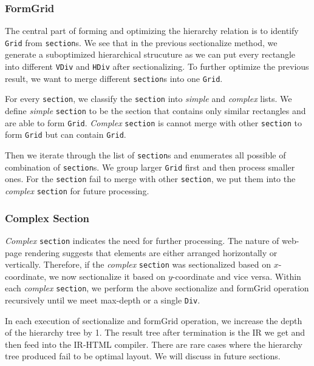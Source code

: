 \documentclass[runningheads]{llncs}
\begin{document}
\subsubsection{FormGrid} The central part of forming and optimizing the hierarchy relation is to identify \lstinline{Grid} from \lstinline{section}s. We see that in the previous sectionalize method, we generate a suboptimized hierarchical strucuture as we can put every rectangle into different \lstinline{VDiv} and \lstinline{HDiv} after sectionalizing. To further optimize the previous result, we want to merge different \lstinline{section}s into one \lstinline{Grid}.

For every \lstinline{section}, we classify the \lstinline{section} into \textit{simple} and \textit{complex} lists. We define \textit{simple} \lstinline{section} to be the section that contains only similar rectangles and are able to form \lstinline{Grid}. \textit{Complex} \lstinline{section} is cannot merge with other \lstinline{section} to form \lstinline{Grid} but can contain \lstinline{Grid}. 


Then we iterate through the list of \lstinline{section}s and enumerates all possible of combination of \lstinline{section}s. We group larger \lstinline{Grid} first and then process smaller ones. For the \lstinline{section} fail to merge with other \lstinline{section}, we put them into the \textit{complex} \lstinline{section} for future processing.

\subsubsection{Complex Section}
\textit{Complex} \lstinline{section} indicates the need for further processing. The nature of web-page rendering suggests that elements are either arranged horizontally or vertically. Therefore, if the \textit{complex} \lstinline{section} was sectionalized based on $x$-coordinate, we now sectionalize it based on $y$-coordinate and vice versa. Within each \textit{complex} \lstinline{section}, we perform the above sectionalize and formGrid operation recursively until we meet max-depth or a single \lstinline{Div}.

In each execution of sectionalize and formGrid operation, we increase the depth of the hierarchy tree by 1. The result tree after termination is the IR we get and then feed into the IR-HTML compiler.
There are rare cases where the hierarchy tree produced fail to be optimal layout. We will discuss in future sections.
\end{document}
